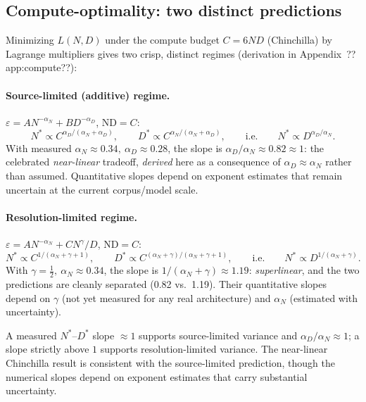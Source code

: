 \documentclass[entropy,article,submit,moreauthors,pdftex]{mdpi}
\newcommand{\eps}{\varepsilon}
\begin{document}
\subsection{Compute-optimality: two distinct predictions}
Minimizing $L(N,D)$ under the compute budget $C=6ND$ (Chinchilla) by
Lagrange multipliers gives two crisp, distinct regimes (derivation in
Appendix~??app:compute??):

\paragraph{Source-limited (additive) regime.}
$\eps=A N^{-\alpha_N}+B D^{-\alpha_D}$, $\text{ND}=C$:
\begin{equation}
  N^* \propto C^{\alpha_D/(\alpha_N+\alpha_D)},\qquad
  D^* \propto C^{\alpha_N/(\alpha_N+\alpha_D)},
  \qquad\text{i.e.}\qquad
  N^* \propto D^{\alpha_D/\alpha_N}.
  \label{eq:sourceopt}
\end{equation}
With measured $\alpha_N\approx0.34,\ \alpha_D\approx0.28$, the slope is
$\alpha_D/\alpha_N\approx0.82\approx1$: the celebrated \emph{near-linear}
tradeoff, \emph{derived} here as a consequence of $\alpha_D\approx\alpha_N$
rather than assumed. Quantitative slopes depend on exponent estimates
that remain uncertain at the current corpus/model scale.

\paragraph{Resolution-limited regime.}
$\eps=A N^{-\alpha_N}+C N^{\gamma}/D$, $\text{ND}=C$:
\begin{equation}
  N^* \propto C^{1/(\alpha_N+\gamma+1)},\qquad
  D^* \propto C^{(\alpha_N+\gamma)/(\alpha_N+\gamma+1)},
  \qquad\text{i.e.}\qquad
  N^* \propto D^{1/(\alpha_N+\gamma)}.
  \label{eq:resolopt}
\end{equation}
With $\gamma=\frac12,\ \alpha_N\approx0.34$, the slope is
$1/(\alpha_N+\gamma)\approx1.19$: \emph{superlinear}, and the two
predictions are cleanly separated (0.82 vs.\ 1.19). Their quantitative
slopes depend on $\gamma$ (not yet measured for any real architecture) and
$\alpha_N$ (estimated with uncertainty).

\begin{prediction}
\label{pred:compute}
A measured $N^*$--$D^*$ slope $\approx1$ supports source-limited variance and
$\alpha_D/\alpha_N\approx1$; a slope strictly above $1$ supports
resolution-limited variance. The near-linear Chinchilla result is consistent
with the source-limited prediction, though the numerical slopes depend on
exponent estimates that carry substantial uncertainty.
\end{prediction}
\end{document}
